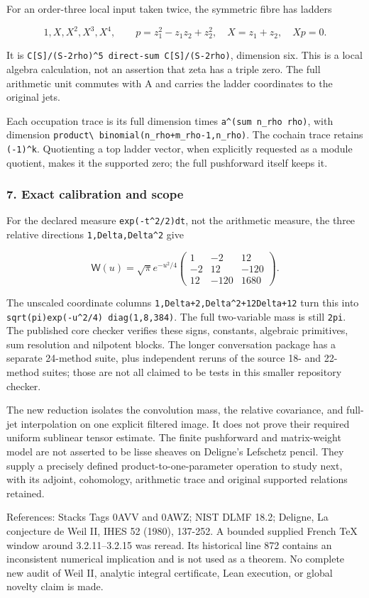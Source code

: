For an order-three local input taken twice, the symmetric fibre has ladders

\[1,X,X^2,X^3,X^4,\qquad p=z_1^2-z_1z_2+z_2^2,\quad X=z_1+z_2,\quad Xp=0.\]

It is \texttt{C{[}S{]}/(S-2rho)\^{}5\ direct-sum\ C{[}S{]}/(S-2rho)}, dimension six. This is a local
algebra calculation, not an assertion that zeta has a triple zero. The full arithmetic unit commutes
with A and carries the ladder coordinates to the original jets.

Each occupation trace is its full dimension times \texttt{a\^{}(sum\ n\_rho\ rho)}, with dimension
\nolinkurl{product\ binomial(n_rho+m_rho-1,n_rho)}. The cochain trace retains \texttt{(-1)\^{}k}.
Quotienting a top ladder vector, when explicitly requested as a module quotient, makes it the
supported zero; the full pushforward itself keeps it.

\subsubsection{7. Exact calibration and scope}\label{pr_17:exact-calibration-and-scope}

For the declared measure \texttt{exp(-t\^{}2/2)dt}, not the arithmetic measure, the three relative
directions \texttt{1,Delta,Delta\^{}2} give

\[\mathsf W(u)=\sqrt\pi e^{-u^2/4}\begin{pmatrix}1&-2&12\\-2&12&-120\\12&-120&1680\end{pmatrix}.\]

The unscaled coordinate columns \texttt{1,Delta+2,Delta\^{}2+12Delta+12} turn this into
\texttt{sqrt(pi)exp(-u\^{}2/4)\ diag(1,8,384)}. The full two-variable mass is still \nolinkurl{2pi}.
The published core checker verifies these signs, constants, algebraic primitives, sum resolution and
nilpotent blocks. The longer conversation package has a separate 24-method suite, plus independent
reruns of the source 18- and 22-method suites; those are not all claimed to be tests in this smaller
repository checker.

The new reduction isolates the convolution mass, the relative covariance, and full-jet interpolation
on one explicit filtered image. It does not prove their required uniform sublinear tensor estimate.
The finite pushforward and matrix-weight model are not asserted to be lisse sheaves on Deligne's
Lefschetz pencil. They supply a precisely defined product-to-one-parameter operation to study next,
with its adjoint, cohomology, arithmetic trace and original supported relations retained.

References: Stacks Tags 0AVV and 0AWZ; NIST DLMF 18.2; Deligne, La conjecture de Weil II, IHES 52
(1980), 137-252. A bounded supplied French TeX window around 3.2.11--3.2.15 was reread. Its
historical line 872 contains an inconsistent numerical implication and is not used as a theorem. No
complete new audit of Weil II, analytic integral certificate, Lean execution, or global novelty
claim is made.
